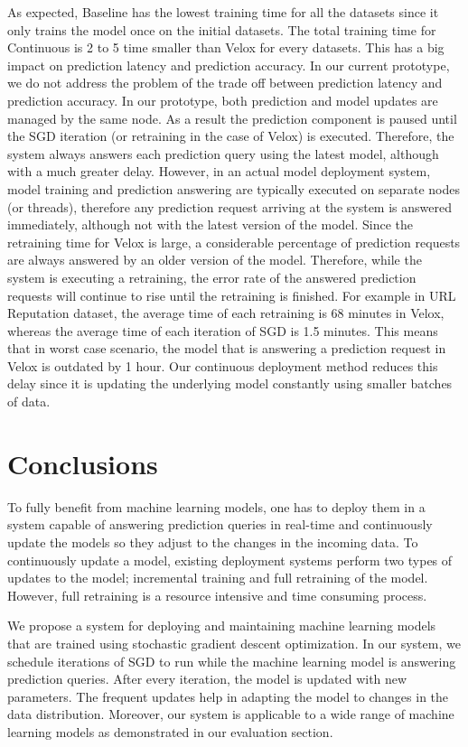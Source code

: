 \documentclass{vldb}
\begin{document}
As expected, Baseline has the lowest training time for all the datasets since it only trains the model once on the initial datasets.
The total training time for Continuous is 2 to 5 time smaller than Velox for every datasets.
This has a big impact on prediction latency and prediction accuracy.
In our current prototype, we do not address the problem of the trade off between prediction latency and prediction accuracy.
In our prototype, both prediction and model updates are managed by the same node.
As a result the prediction component is paused until the SGD iteration (or retraining in the case of Velox) is executed.
Therefore, the system always answers each prediction query using the latest model, although with a much greater delay.
However, in an actual model deployment system, model training and prediction answering are typically executed on separate nodes (or threads), therefore any prediction request arriving at the system is answered immediately, although not with the latest version of the model.
Since the retraining time for Velox is large, a considerable percentage of prediction requests are always answered by an older version of the model.
Therefore, while the system is executing a retraining, the error rate of the answered prediction requests will continue to rise until the retraining is finished.
For example in URL Reputation dataset, the average time of each retraining is 68 minutes in Velox, whereas the average time of each iteration of SGD is 1.5 minutes.
This means that in worst case scenario, the model that is answering a prediction request in Velox is outdated by 1 hour.
Our continuous deployment method reduces this delay since it is updating the underlying model constantly using smaller batches of data.

\section{Conclusions} \label{conclusion}
To fully benefit from machine learning models, one has to deploy them in a system capable of answering prediction queries in real-time and continuously update the models so they adjust to the changes in the incoming data.
To continuously update a model, existing deployment systems perform two types of updates to the model; incremental training and full retraining of the model.
However, full retraining is a resource intensive and time consuming process.

We propose a system for deploying and maintaining machine learning models that are trained using stochastic gradient descent optimization.
In our system, we schedule iterations of SGD to run while the machine learning model is answering prediction queries.
After every iteration, the model is updated with new parameters.
The frequent updates help in adapting the model to changes in the data distribution.
Moreover, our system is applicable to a wide range of machine learning models as demonstrated in our evaluation section.
\end{document}

